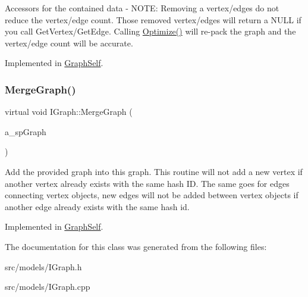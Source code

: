 Accessors for the contained data -\/ N\+O\+TE\+: Removing a vertex/edges do not reduce the vertex/edge count. Those removed vertex/edge\textquotesingle{}s will return a N\+U\+LL if you call Get\+Vertex/\+Get\+Edge. Calling \hyperlink{class_i_graph_a871950046092ba81c590844b98e3a5da}{Optimize()} will re-\/pack the graph and the vertex/edge count will be accurate. 

Implemented in \hyperlink{class_graph_self_aa1514f3883bef6d823bd56d91a565b9c}{Graph\+Self}.

\mbox{\label{class_i_graph_ac18561fc46a616fde450687f557897ac}} 
\subsubsection{\texorpdfstring{Merge\+Graph()}{MergeGraph()}}
{\footnotesize\ttfamily virtual void I\+Graph\+::\+Merge\+Graph (\begin{DoxyParamCaption}\item[{const I\+Graph\+::\+SP \&}]{a\+\_\+sp\+Graph }\end{DoxyParamCaption})\hspace{0.3cm}{\ttfamily [pure virtual]}}

Add the provided graph into this graph. This routine will not add a new vertex if another vertex already exists with the same hash ID. The same goes for edges connecting vertex objects, new edges will not be added between vertex objects if another edge already exists with the same hash id. 

Implemented in \hyperlink{class_graph_self_a64103889965233bb574b55bf2b7b1188}{Graph\+Self}.



The documentation for this class was generated from the following files\+:\begin{DoxyCompactItemize}
\item 
src/models/I\+Graph.\+h\item 
src/models/I\+Graph.\+cpp\end{DoxyCompactItemize}
